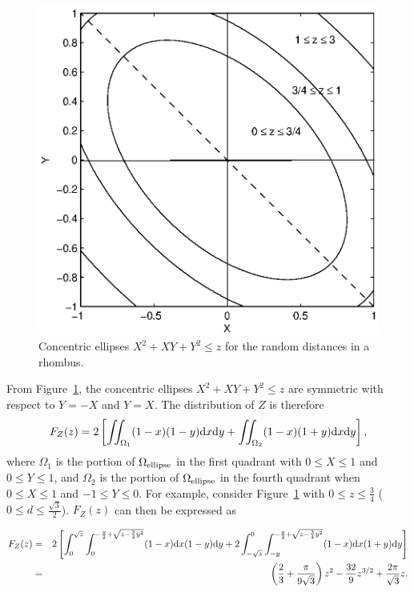 \documentclass[12pt,draftclsnofoot,onecolumn]{IEEEtran}
\begin{document}
\begin{figure}
  \centering
  \includegraphics[width=0.5\columnwidth]{fig/rhombus_within}
  \caption{Concentric ellipses $X^2+XY+Y^2 \leq z$ for the random distances in a rhombus.}
  \label{fig:z1}
\end{figure}

From Figure~\ref{fig:z1}, the concentric ellipses $X^2+XY+Y^2 \leq z$ are symmetric with respect to $Y=-X$ and $Y=X$.
The distribution of $Z$ is therefore
\begin{equation}
\label{eq:within}
F_Z(z)=2\left[\iint_{\Omega_1}(1-x)(1-y){\rm d}x{\rm
d}y+\iint_{\Omega_2}(1-x)(1+y){\rm d}x{\rm d}y\right],
\end{equation}
where $\Omega_1$ is the portion of $\Omega_{\rm ellipse}$ in the first quadrant with
$0 \leq X\leq 1$ and $0 \leq Y \leq 1$, and $\Omega_2$ is the portion of
$\Omega_{\rm ellipse}$ in the fourth quadrant when
$0 \leq X \leq 1$ and $-1 \leq Y \leq 0$.
For example, consider Figure~\ref{fig:z1} with $0\leq z \leq \frac{3}{4}$ ($0\leq d\leq\frac{\sqrt{3}}{2}$).
$F_Z(z)$ can then be expressed as
\begin{small}
\begin{eqnarray}\label{eq:Z1_r_within}
F_Z(z)&=&2\left[\int_{0}^{\sqrt{z}}\int_{0}^{-\frac{y}{2}+\sqrt{z-\frac{3}{4}y^2
}}(1-x){\rm d}x(1-y){\rm
d}y+2\int_{-\sqrt{z}}^0\int_{-y}^{-\frac{y}{2}+\sqrt{z-\frac{3}{4}
y^2}}(1-x){\rm d}x(1+y){\rm d}y\right] \nonumber\\
&=&\left(\frac{2}{3}+\frac{\pi}{9\sqrt{3}}\right)z^2-\frac{32}{9}z^{3/2}+\frac{
2\pi}{\sqrt{3}}z.
\end{eqnarray}
\end{small}%
\end{document}
